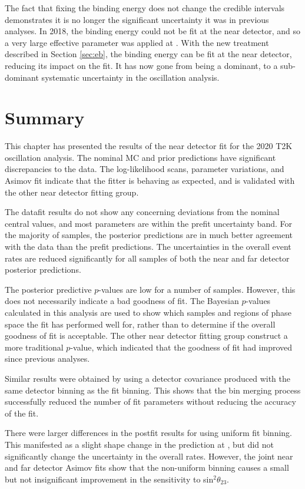The fact that fixing the binding energy does not change the credible intervals demonstrates it is no longer the significant uncertainty it was in previous analyses. In 2018, the binding energy could not be fit at the near detector, and so a very large effective parameter was applied at \SK. With the new treatment described in Section \ref{sec:eb}, the binding energy can be fit at the near detector, reducing its impact on the fit. It has now gone from being a dominant, to a sub-dominant systematic uncertainty in the oscillation analysis.

\section{Summary}

This chapter has presented the results of the near detector fit for the 2020 T2K oscillation analysis. The nominal MC and prior predictions have significant discrepancies to the data. The log-likelihood scans, parameter variations, and Asimov fit indicate that the fitter is behaving as expected, and is validated with the other near detector fitting group.

The datafit results do not show any concerning deviations from the nominal central values, and most parameters are within the prefit uncertainty band. For the majority of samples, the posterior predictions are in much better agreement with the data than the prefit predictions. The uncertainties in the overall event rates are reduced significantly for all samples of both the near and far detector posterior predictions.

The posterior predictive $p$-values are low for a number of samples. However, this does not necessarily indicate a bad goodness of fit. The Bayesian $p$-values calculated in this analysis are used to show which samples and regions of phase space the fit has performed well for, rather than to determine if the overall goodness of fit is acceptable. The other near detector fitting group construct a more traditional $p$-value, which indicated that the goodness of fit had improved since previous analyses.

Similar results were obtained by using a detector covariance produced with the same detector binning as the fit binning. This shows that the bin merging process successfully reduced the number of fit parameters without reducing the accuracy of the fit. 

There were larger differences in the postfit results for using uniform fit binning. This manifested as a slight shape change in the prediction at \SK, but did not significantly change the uncertainty in the overall rates. However, the joint near and far detector Asimov fits show that the non-uniform binning causes a small but not insignificant improvement in the sensitivity to sin$^2\theta_{23}$.

